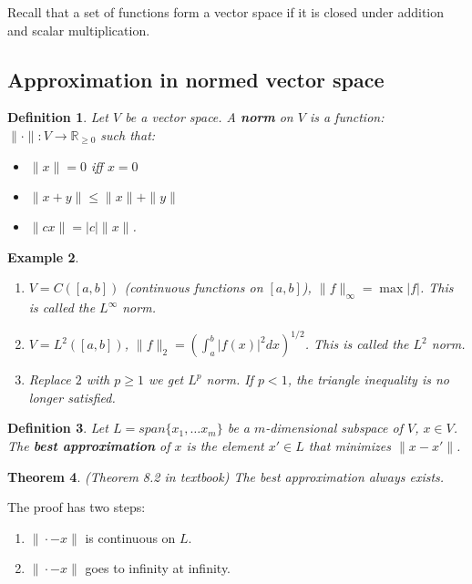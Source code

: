 \documentclass{article} %
\theoremstyle{break}
\newtheorem{definition}{Definition}[section]
\newtheorem{exa}[definition]{Example}
\newtheorem{thm}[definition]{Theorem}
\begin{document}
Recall that a set of functions form a vector space if it is closed under addition and scalar multiplication.


\subsection{Approximation in normed vector space}

\begin{definition} Let $V$ be a vector space. A {\bf norm} on $V$ is a function: $\|\cdot \|: V\rightarrow \mathbb{R}_{\geq 0}$ such that:
  \begin{itemize}
  \item $\|x\|=0$ iff $x=0$
  \item $\|x+y\|\leq \|x\|+\|y\|$
  \item $\|cx\|=|c|\|x\|$.
  \end{itemize}
\end{definition}

\begin{exa}
  \begin{enumerate}
   \item $V=C([a, b])$ (continuous functions on $[a, b]$), $\|f\|_\infty=\max|f|$. This is called the $L^\infty$ norm.
   \item $V=L^2([a, b])$, $\|f\|_2=(\int_a^b|f(x)|^2dx)^{1/2}$. This is called the $L^2$ norm.
   \item Replace $2$ with $p\geq 1$ we get $L^p$ norm. If $p<1$, the triangle inequality is no longer satisfied.  
  \end{enumerate}
\end{exa}


\begin{definition}
Let $L=span\{x_1, \dots x_m\}$ be a $m$-dimensional subspace of $V$, $x\in V$. The {\bf best approximation} of $x$ is the element $x'\in L$ that minimizes $\|x-x'\|$.  
\end{definition}

\begin{thm} (Theorem 8.2 in textbook) The best approximation always exists.\end{thm}

The proof has two steps:

\begin{enumerate}
\item $\|\cdot-x\|$ is continuous on $L$.
\item $\|\cdot-x\|$ goes to infinity at infinity.
\end{enumerate}
\end{document}
